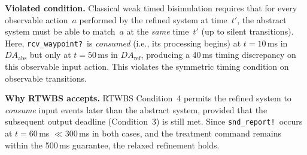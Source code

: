 \begin{table}[t]
\medskip\noindent
\textbf{Violated condition.}\quad
Classical weak timed bisimulation requires that for every observable
action~$a$ performed by the refined system at time~$t'$, the abstract
system must be able to match~$a$ at the \emph{same} time~$t'$ (up to
silent transitions).  Here, \texttt{rcv\_waypoint?}\ is
\emph{consumed} (i.e., its processing begins) at $t=10$\,ms in
$\mathit{DA}_{\mathrm{abs}}$ but only at $t=50$\,ms in
$\mathit{DA}_{\mathrm{ref}}$, producing a 40\,ms timing discrepancy
on this observable input action.  This violates the symmetric timing
condition on observable transitions.

\medskip\noindent
\textbf{Why RTWBS accepts.}\quad
RTWBS Condition~4 permits the refined system to \emph{consume} input
events later than the abstract system, provided that the subsequent
output deadline (Condition~3) is still met.  Since
\texttt{snd\_report!}\ occurs at $t=60$\,ms $\ll 300$\,ms in both
cases, and the treatment command remains within the 500\,ms guarantee,
the relaxed refinement holds.
\end{table}
